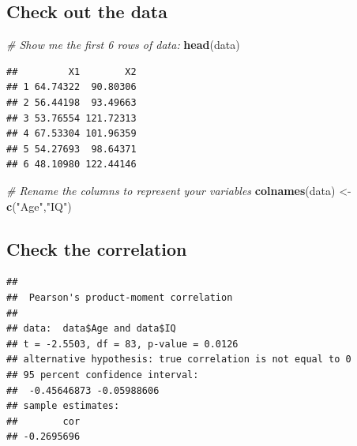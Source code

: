 \documentclass[
]{book}
\newenvironment{Shaded}{\begin{snugshade}}{\end{snugshade}}
\newcommand{\CommentTok}[1]{\textcolor[rgb]{0.56,0.35,0.01}{\textit{#1}}}
\newcommand{\FunctionTok}[1]{\textcolor[rgb]{0.13,0.29,0.53}{\textbf{#1}}}
\newcommand{\NormalTok}[1]{#1}
\newcommand{\OtherTok}[1]{\textcolor[rgb]{0.56,0.35,0.01}{#1}}
\newcommand{\SpecialCharTok}[1]{\textcolor[rgb]{0.81,0.36,0.00}{\textbf{#1}}}
\newcommand{\StringTok}[1]{\textcolor[rgb]{0.31,0.60,0.02}{#1}}
\begin{document}
\subsection*{Check out the data}\label{check-out-the-data}

\begin{Shaded}
\begin{Highlighting}[]
\CommentTok{\# Show me the first 6 rows of data: }
\FunctionTok{head}\NormalTok{(data)}
\end{Highlighting}
\end{Shaded}

\begin{verbatim}
##         X1        X2
## 1 64.74322  90.80306
## 2 56.44198  93.49663
## 3 53.76554 121.72313
## 4 67.53304 101.96359
## 5 54.27693  98.64371
## 6 48.10980 122.44146
\end{verbatim}

\begin{Shaded}
\begin{Highlighting}[]
\CommentTok{\# Rename the columns to represent your variables }
\FunctionTok{colnames}\NormalTok{(data) }\OtherTok{\textless{}{-}} \FunctionTok{c}\NormalTok{(}\StringTok{"Age"}\NormalTok{,}\StringTok{"IQ"}\NormalTok{)}
\end{Highlighting}
\end{Shaded}

\subsection*{Check the correlation}\label{check-the-correlation}

\begin{Shaded}
\end{Shaded}

\begin{verbatim}
## 
##  Pearson's product-moment correlation
## 
## data:  data$Age and data$IQ
## t = -2.5503, df = 83, p-value = 0.0126
## alternative hypothesis: true correlation is not equal to 0
## 95 percent confidence interval:
##  -0.45646873 -0.05988606
## sample estimates:
##        cor 
## -0.2695696
\end{verbatim}
\end{document}
